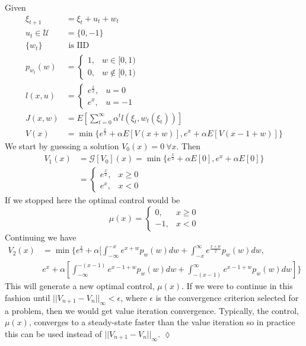 \documentclass[lecture,12pt,]{pcms-l}
\begin{document}
\begin{example}
Given
\begin{align*}
\xi_{t+1} &= \xi_t+u_t+w_t \\
u_t\in\mathcal{U} &= \{0,-1\} \\
\{w_t\} &\text{ is IID} \\
p_{w_t}(w) &= \begin{cases} 1, & w\in[0,1) \\ 0, & w\notin[0,1) \end{cases} \\
l(x,u) &= \begin{cases} e^{\frac{x}{2}}, & u=0 \\ e^x, & u=-1 \end{cases} \\
J(x,w) &= E[\sum_{t=0}^\infty \alpha^tl(\xi_t,w_t(\xi_t))] \\
V(x) &= \min\{e^{\frac{x}{2}} + \alpha E[V(x+w)], e^x + \alpha E[V(x-1+w)]\}
\end{align*}
We start by guessing a solution $V_0(x)=0 ~\forall x$. Then
\begin{align*}
V_1(x) &= \mathcal{G}[V_0](x) = \min\{e^{\frac{x}{2}}+\alpha E[0], e^x + \alpha E[0]\} \\
&= \begin{cases} e^{\frac{x}{2}}, & x\geq0 \\ e^x, & x<0 \end{cases}
\end{align*}
If we stopped here the optimal control would be
$$\mu(x) = \begin{cases} 0, & x\geq0 \\ -1, & x<0 \end{cases}$$
Continuing we have
\begin{align*}
V_2(x) &= \min\{e^{\frac{x}{2}} + \alpha[\int_{-\infty}^{-x} e^{x+w}p_w(w)dw + \int_{-x}^\infty e^{\frac{x+w}{2}}p_w(w)dw, \\
&e^x+\alpha[\int_{-\infty}^{-(x-1)}e^{x-1+w}p_w(w)dw + \int_{-(x-1)}^\infty e^{x-1+w}p_w(w)dw]\}
\end{align*}
This will generate a new optimal control, $\mu(x)$. If we were to continue in this fashion until $||V_{n+1}-V_n||_\infty<\epsilon$, where $\epsilon$ is the convergence criterion selected for a problem, then we would get value iteration convergence. Typically, the control, $\mu(x)$, converges to a steady-state faster than the value iteration so in practice this can be used instead of $||V_{n+1}-V_n||_\infty$.
$\lozenge$
\end{example}
\end{document}
